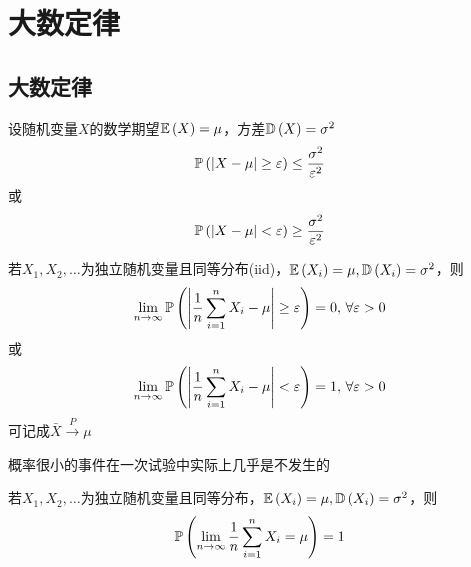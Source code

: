 
\section{大数定律}
\subsection{大数定律}
\begin{theorem}
设随机变量$X$的数学期望$\mathbb{E}\left(X\right)=\mu$，方差$\mathbb{D}\left(X\right)=\sigma^2$
\[\mathbb{P}\left(|X-\mu|\geq\varepsilon\right)\leq\dfrac{\sigma^2}{\varepsilon^2}\]
或
\[\mathbb{P}\left(|X-\mu|<\varepsilon\right)\geq\frac{\sigma^2}{\varepsilon^2}\]
\end{theorem}
\begin{theorem}[弱大数定律(辛钦)]
若$X_1,X_2,\ldots$为独立随机变量且同等分布(iid)，$\mathbb{E}\left(X_i\right)=\mu,\mathbb{D}\left(X_i\right)=\sigma^2$，则
\[\lim_{n\to\infty}\mathbb{P}\left(\left|\dfrac{1}{n}\sum_{i=1}^nX_i-\mu\right|\geq\varepsilon\right)=0,\,\forall\varepsilon>0\]
或
\[\lim_{n\to\infty}\mathbb{P}\left(\left|\dfrac{1}{n}\sum_{i=1}^nX_i-\mu\right|<\varepsilon\right)=1,\,\forall\varepsilon>0\]
可记成$\bar{X}\xrightarrow{P}\mu$
\end{theorem}
\begin{theorem}[实际推断原理]
概率很小的事件在一次试验中实际上几乎是不发生的
\end{theorem}
\begin{theorem}[强大数定律]
若$X_1,X_2,\ldots$为独立随机变量且同等分布，$\mathbb{E}\left(X_i\right)=\mu,\mathbb{D}\left(X_i\right)=\sigma^2$，则
\[\mathbb{P}\left(\lim_{n\to\infty}\dfrac{1}{n}\sum_{i=1}^nX_i=\mu\right)=1\]
\end{theorem}

